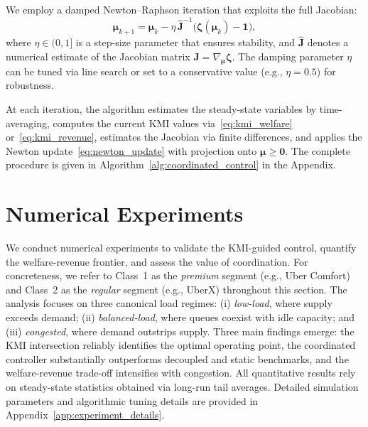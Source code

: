 We employ a damped Newton--Raphson iteration that exploits the full Jacobian:
\begin{equation}
\boldsymbol{\mu}_{k+1}
=
\boldsymbol{\mu}_k
-
\eta\,
\hat{\mathbf{J}}^{-1}
\bigl(\boldsymbol{\zeta}(\boldsymbol{\mu}_k)-\mathbf{1}\bigr),
\label{eq:newton_update}
\end{equation}
where $\eta \in (0,1]$ is a step-size parameter that ensures stability, and $\hat{\mathbf{J}}$ denotes a numerical estimate of the Jacobian matrix $\mathbf{J} = \nabla_{\boldsymbol{\mu}} \boldsymbol{\zeta}$.
The damping parameter $\eta$ can be tuned via line search or set to a conservative value (e.g., $\eta = 0.5$) for robustness.

At each iteration, the algorithm estimates the steady-state variables by time-averaging, computes the current KMI values via~\eqref{eq:kmi_welfare} or~\eqref{eq:kmi_revenue}, estimates the Jacobian via finite differences, and applies the Newton update~\eqref{eq:newton_update} with projection onto $\boldsymbol{\mu} \geq \mathbf{0}$.
The complete procedure is given in Algorithm~\ref{alg:coordinated_control} in the Appendix.

\section{Numerical Experiments}\label{sec:numerical_experiments}

We conduct numerical experiments to validate the KMI-guided control, quantify the welfare-revenue frontier, and assess the value of coordination.
For concreteness, we refer to Class~1 as the \emph{premium} segment (e.g., Uber Comfort) and Class~2 as the \emph{regular} segment (e.g., UberX) throughout this section.
The analysis focuses on three canonical load regimes: (i) \textit{low-load}, where supply exceeds demand; (ii) \textit{balanced-load}, where queues coexist with idle capacity; and (iii) \textit{congested}, where demand outstrips supply.
Three main findings emerge: the KMI intersection reliably identifies the optimal operating point, the coordinated controller substantially outperforms decoupled and static benchmarks, and the welfare-revenue trade-off intensifies with congestion.
All quantitative results rely on steady-state statistics obtained via long-run tail averages.
Detailed simulation parameters and algorithmic tuning details are provided in Appendix~\ref{app:experiment_details}.

